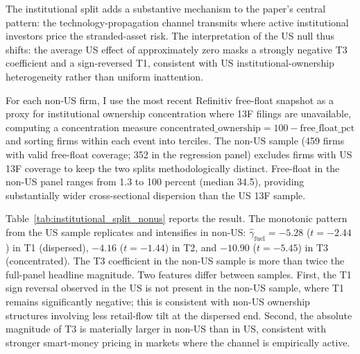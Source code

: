 \documentclass[12pt,a4paper]{article}
\begin{document}
The institutional split adds a substantive mechanism to the paper's central pattern: the technology-propagation channel transmits where active institutional investors price the stranded-asset risk. The interpretation of the US null thus shifts: the average US effect of approximately zero masks a strongly negative T3 coefficient and a sign-reversed T1, consistent with US institutional-ownership heterogeneity rather than uniform inattention.

For each non-US firm, I use the most recent Refinitiv free-float snapshot as a proxy for institutional ownership concentration where 13F filings are unavailable, computing a concentration measure $\text{concentrated\_ownership} = 100 - \text{free\_float\_pct}$ and sorting firms within each event into terciles. The non-US sample (459 firms with valid free-float coverage; 352 in the regression panel) excludes firms with US 13F coverage to keep the two splits methodologically distinct. Free-float in the non-US panel ranges from 1.3 to 100 percent (median 34.5), providing substantially wider cross-sectional dispersion than the US 13F sample.

Table~\ref{tab:institutional_split_nonus} reports the result. The monotonic pattern from the US sample replicates and intensifies in non-US: $\hat\gamma_{\text{fuel}} = -5.28$ ($t = -2.44$) in T1 (dispersed), $-4.16$ ($t = -1.44$) in T2, and $-10.90$ ($t = -5.45$) in T3 (concentrated). The T3 coefficient in the non-US sample is more than twice the full-panel headline magnitude. Two features differ between samples. First, the T1 sign reversal observed in the US is not present in the non-US sample, where T1 remains significantly negative; this is consistent with non-US ownership structures involving less retail-flow tilt at the dispersed end. Second, the absolute magnitude of T3 is materially larger in non-US than in US, consistent with stronger smart-money pricing in markets where the channel is empirically active.
\end{document}
